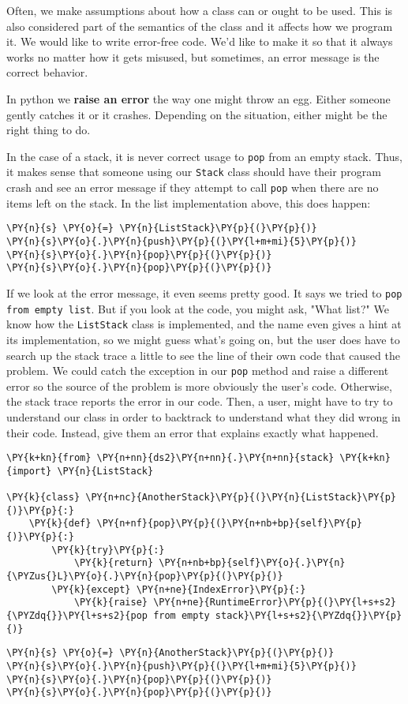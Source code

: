 Often, we make assumptions about how a class can or ought to be used.
This is also considered part of the semantics of the class and it affects how we program it.
We would like to write error-free code.
We'd like to make it so that it always works no matter how it gets misused, but sometimes, an error message is the correct behavior.


In python we \textbf{raise an error} the way one might throw an egg.
Either someone gently catches it or it crashes.
Depending on the situation, either might be the right thing to do.


In the case of a stack, it is never correct usage to \texttt{pop} from an empty stack.
Thus, it makes sense that someone using our \texttt{Stack} class should have their program crash and see an error message if they attempt to call \texttt{pop} when there are no items left on the stack.
In the list implementation above, this does happen:

\begin{Verbatim}[commandchars=\\\{\}]
\PY{n}{s} \PY{o}{=} \PY{n}{ListStack}\PY{p}{(}\PY{p}{)}
\PY{n}{s}\PY{o}{.}\PY{n}{push}\PY{p}{(}\PY{l+m+mi}{5}\PY{p}{)}
\PY{n}{s}\PY{o}{.}\PY{n}{pop}\PY{p}{(}\PY{p}{)}
\PY{n}{s}\PY{o}{.}\PY{n}{pop}\PY{p}{(}\PY{p}{)}
\end{Verbatim}



If we look at the error message, it even seems pretty good.
It says we tried to \texttt{pop from empty list}.
But if you look at the code, you might ask, "What list?"
We know how the \texttt{ListStack} class is implemented, and the name even gives a hint at its implementation, so we might guess what's going on, but the user does have to search up the stack trace a little to see the line of their own code that caused the problem.
We could catch the exception in our \texttt{pop} method and raise a different error so the source of the problem is more obviously the user's code.
Otherwise, the stack trace reports the error in our code.
Then, a user, might have to try to understand our class in order to backtrack to understand what they did wrong in their code.
Instead, give them an error that explains exactly what happened.

\begin{Verbatim}[commandchars=\\\{\}]
\PY{k+kn}{from} \PY{n+nn}{ds2}\PY{n+nn}{.}\PY{n+nn}{stack} \PY{k+kn}{import} \PY{n}{ListStack}

\PY{k}{class} \PY{n+nc}{AnotherStack}\PY{p}{(}\PY{n}{ListStack}\PY{p}{)}\PY{p}{:}
    \PY{k}{def} \PY{n+nf}{pop}\PY{p}{(}\PY{n+nb+bp}{self}\PY{p}{)}\PY{p}{:}
        \PY{k}{try}\PY{p}{:}
            \PY{k}{return} \PY{n+nb+bp}{self}\PY{o}{.}\PY{n}{\PYZus{}L}\PY{o}{.}\PY{n}{pop}\PY{p}{(}\PY{p}{)}
        \PY{k}{except} \PY{n+ne}{IndexError}\PY{p}{:}
            \PY{k}{raise} \PY{n+ne}{RuntimeError}\PY{p}{(}\PY{l+s+s2}{\PYZdq{}}\PY{l+s+s2}{pop from empty stack}\PY{l+s+s2}{\PYZdq{}}\PY{p}{)}
\end{Verbatim}


\begin{Verbatim}[commandchars=\\\{\}]
\PY{n}{s} \PY{o}{=} \PY{n}{AnotherStack}\PY{p}{(}\PY{p}{)}
\PY{n}{s}\PY{o}{.}\PY{n}{push}\PY{p}{(}\PY{l+m+mi}{5}\PY{p}{)}
\PY{n}{s}\PY{o}{.}\PY{n}{pop}\PY{p}{(}\PY{p}{)}
\PY{n}{s}\PY{o}{.}\PY{n}{pop}\PY{p}{(}\PY{p}{)}
\end{Verbatim}
